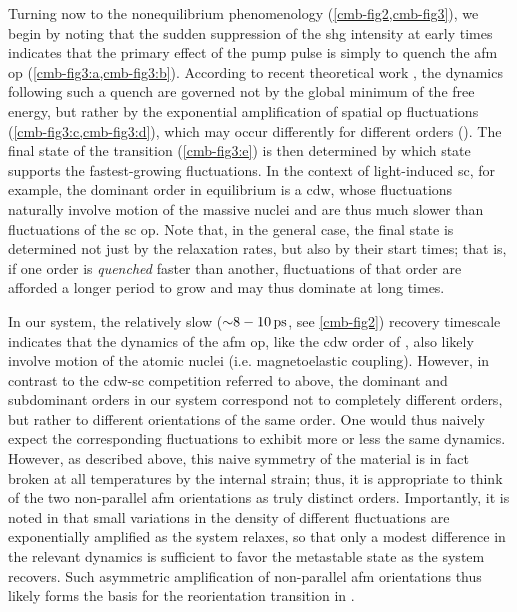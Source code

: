Turning now to the nonequilibrium phenomenology (\cref{cmb-fig2,cmb-fig3}), we begin by noting that the sudden suppression of the \gls{shg} intensity at early times indicates that the primary effect of the pump pulse is simply to quench the \gls{afm} \gls{op} (\cref{cmb-fig3:a,cmb-fig3:b}).
According to recent theoretical work \citep{sun_transient_2020, dolgirev_self-similar_2020}, the dynamics following such a quench are governed not by the global minimum of the free energy, but rather by the exponential amplification of spatial \gls{op} fluctuations (\cref{cmb-fig3:c,cmb-fig3:d}), which may occur differently for different orders ().
The final state of the transition (\cref{cmb-fig3:e}) is then determined by which state supports the fastest-growing fluctuations.
In the context of light-induced \gls{sc}\citep{fausti_light-induced_2011,cremin_photoenhanced_2019}, for example, the dominant order in equilibrium is a \gls{cdw}, whose fluctuations naturally involve motion of the massive nuclei and are thus much slower than fluctuations of the \gls{sc} \gls{op}\citep{smallwood_tracking_2012,sun_transient_2020}.
Note that, in the general case, the final state is determined not just by the relaxation rates, but also by their start times; that is, if one order is \textit{quenched} faster than another, fluctuations of that order are afforded a longer period to grow and may thus dominate at long times.

In our system, the relatively slow (${\sim} \num{8}-\qty{10}{ps}$, see \cref{cmb-fig2}) recovery timescale indicates that the dynamics of the \gls{afm} \gls{op}, like the \gls{cdw} order of \citet{fausti_light-induced_2011}, also likely involve motion of the atomic nuclei (i.e. magnetoelastic coupling).
However, in contrast to the \gls{cdw}-\gls{sc} competition referred to above, the dominant and subdominant orders in our system correspond not to completely different orders, but rather to different orientations of the same order.
One would thus naively expect the corresponding fluctuations to exhibit more or less the same dynamics.
However, as described above, this naive symmetry of the material is in fact broken at all temperatures by the internal strain; thus, it is appropriate to think of the two non-parallel \gls{afm} orientations as truly distinct orders.
Importantly, it is noted in \citet{sun_transient_2020} that small variations in the density of different fluctuations are exponentially amplified as the system relaxes, so that only a modest difference in the relevant dynamics is sufficient to favor the metastable state as the system recovers.
Such asymmetric amplification of non-parallel \gls{afm} orientations thus likely forms the basis for the reorientation transition in \cmb.

